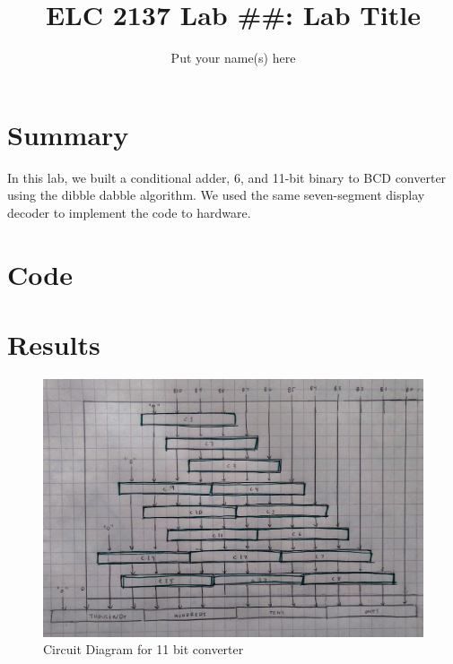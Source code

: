 \documentclass[11pt]{article}
\newcommand{\Verilog}[2][]{%
	
}
\begin{document}
\title{ELC 2137 Lab \#\#: Lab Title}
\author{Put your name(s) here}

\maketitle


\section*{Summary}

In this lab, we built a conditional adder, 6, and 11-bit binary to BCD converter using the dibble dabble algorithm. We used the same seven-segment display decoder to implement the code to hardware.


\section*{Code}

\Verilog[firstline=23, caption=Add3 ,label=code:file_1]{add3.sv}
\Verilog[firstline=23, caption=Add3 Test ,label=code:file_2]{add3_test.sv}
\Verilog[firstline=23, caption=6 bit BCD,label=code:file_3]{BCD6b.sv}
\Verilog[firstline=23, caption=Sseg 6 bit BCD Test ,label=code:file_4]{BCD6b_test.sv}
\Verilog[firstline=23, caption=11 bit BCD ,label=code:file_5]{BCD11b.sv}
\Verilog[firstline=23, caption=11 bit BCD Test ,label=code:file_6]{BCD11b_test.sv}
\Verilog[firstline=23, caption=Sseg1 for BCD,label=code:file_7]{sseg1_BCD.sv}

\section*{Results}

\begin{figure}[ht]\centering
	\includegraphics[width=.75\textwidth]{ckt_diagram_11b}
	\caption{Circuit Diagram for 11 bit converter}
	\label{fig:b3_0}			
\end{figure}
\end{document}
